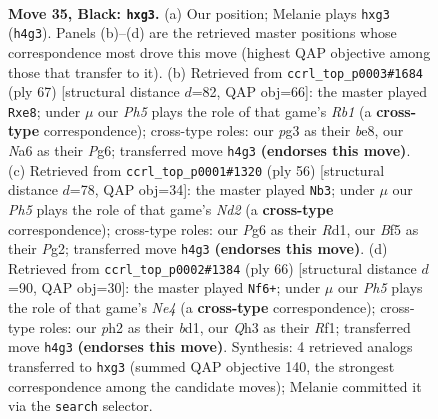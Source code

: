 \documentclass[11pt]{article}
\begin{document}
\clearpage

\begin{figure}[p]\centering
\begin{subfigure}{0.46\textwidth}\centering
\resizebox{\linewidth}{!}{%
\newchessgame
\chessboard[
  setfen={1r6/pp4k1/n5p1/2pP1bp1/7p/P3QPPq/1PB4P/2RR2K1 b - - 3 35},
  showmover=false,
  pgfstyle=straightmove, color=movearrow, markmove={h4-g3}
]}
\caption{}
\end{subfigure}\hfill
\begin{subfigure}{0.46\textwidth}\centering
\resizebox{\linewidth}{!}{%
\newchessgame
\chessboard[
  setfen={1r2B3/2q2pkp/3p2p1/N2P2Pn/2P1pb1P/R7/4QP2/R5K1 b - - 0 34},
  showmover=false,
  pgfstyle=straightmove, color=movearrow, markmove={b8-e8}
]}
\caption{}
\end{subfigure}
\\[4pt]
\begin{subfigure}{0.46\textwidth}\centering
\resizebox{\linewidth}{!}{%
\newchessgame
\chessboard[
  setfen={3r3r/1pq5/p3pk2/4p1b1/PP2P1Qp/3B4/2PN2PP/3R3K w - - 1 29},
  showmover=false,
  pgfstyle=straightmove, color=movearrow, markmove={d2-b3}
]}
\caption{}
\end{subfigure}\hfill
\begin{subfigure}{0.46\textwidth}\centering
\resizebox{\linewidth}{!}{%
\newchessgame
\chessboard[
  setfen={r1r3k1/2q4p/4p1pb/pBB2p2/P1P1N3/1pQ5/1P6/K2b1R2 w - - 0 34},
  showmover=false,
  pgfstyle=straightmove, color=movearrow, markmove={e4-f6}
]}
\caption{}
\end{subfigure}
\caption{\textbf{Move 35, Black: \texttt{hxg3}.} (a) Our position; Melanie plays \texttt{hxg3} (\texttt{h4g3}). Panels (b)--(d) are the retrieved master positions whose correspondence most drove this move (highest QAP objective among those that transfer to it). (b) Retrieved from \texttt{ccrl\_top\_p0003\#1684} (ply 67) [structural distance $d$=82, QAP obj=66]: the master played \texttt{Rxe8}; under $\mu$ our \emph{Ph5} plays the role of that game's \emph{Rb1} (a \textbf{cross-type} correspondence); cross-type roles: our \emph{p}g3 as their \emph{b}e8, our \emph{N}a6 as their \emph{P}g6; transferred move \texttt{h4g3} \textbf{(endorses this move)}. (c) Retrieved from \texttt{ccrl\_top\_p0001\#1320} (ply 56) [structural distance $d$=78, QAP obj=34]: the master played \texttt{Nb3}; under $\mu$ our \emph{Ph5} plays the role of that game's \emph{Nd2} (a \textbf{cross-type} correspondence); cross-type roles: our \emph{P}g6 as their \emph{R}d1, our \emph{B}f5 as their \emph{P}g2; transferred move \texttt{h4g3} \textbf{(endorses this move)}. (d) Retrieved from \texttt{ccrl\_top\_p0002\#1384} (ply 66) [structural distance $d$=90, QAP obj=30]: the master played \texttt{Nf6+}; under $\mu$ our \emph{Ph5} plays the role of that game's \emph{Ne4} (a \textbf{cross-type} correspondence); cross-type roles: our \emph{p}h2 as their \emph{b}d1, our \emph{Q}h3 as their \emph{R}f1; transferred move \texttt{h4g3} \textbf{(endorses this move)}. Synthesis: 4 retrieved analogs transferred to \texttt{hxg3} (summed QAP objective 140, the strongest correspondence among the candidate moves); Melanie committed it via the \texttt{search} selector.}
\label{fig:thought-m69}
\end{figure}
\end{document}
